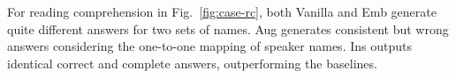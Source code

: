 For reading comprehension in Fig.~\ref{fig:case-rc}, both Vanilla and Emb generate quite different answers for two sets of names. Aug generates consistent but wrong answers considering the one-to-one mapping of speaker names. Ins outputs identical correct and complete answers, outperforming the baselines.










			
			


